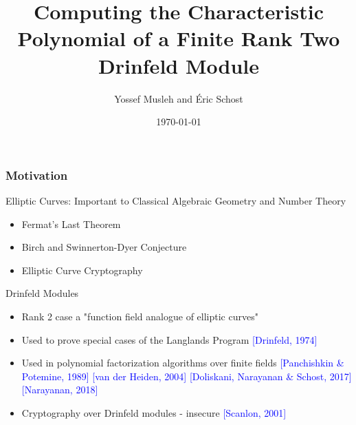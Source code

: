 \documentclass{beamer}
\title[]{Computing the Characteristic Polynomial of a Finite Rank Two Drinfeld Module} %
\author{  Yossef Musleh and \'Eric Schost} %
\institute[UW] %
{
University of Waterloo \\ %
\medskip
\textit{ISSAC 2019 \\ Beihang University \\ Beijing, People's Republic of China} %
}
\date{\today} %
\newcommand{\blue}{\textcolor{blue}}
\begin{document}
\begin{frame}
\titlepage %
\end{frame}



\begin{frame}
\frametitle{Motivation}



  Elliptic Curves: Important to Classical Algebraic Geometry and Number Theory
\begin{itemize}
 \item     Fermat's Last Theorem
\item Birch and Swinnerton-Dyer Conjecture
 \item Elliptic Curve Cryptography
 \end{itemize}

    

 Drinfeld Modules

\begin{itemize}

\item Rank 2 case a "function field analogue of elliptic curves"
  \item Used to prove special cases of the Langlands Program \textcolor{blue}{[Drinfeld, 1974]}
   \item  Used in polynomial factorization algorithms over finite fields \blue{[Panchishkin \& Potemine, 1989]} \blue{[van der Heiden, 2004]} \blue{[Doliskani, Narayanan \& Schost, 2017]} \blue{[Narayanan, 2018]}
    
 
     \item Cryptography over Drinfeld modules - insecure \blue{[Scanlon, 2001]}
     \end{itemize}
  
  
  

\end{frame}
\end{document}
